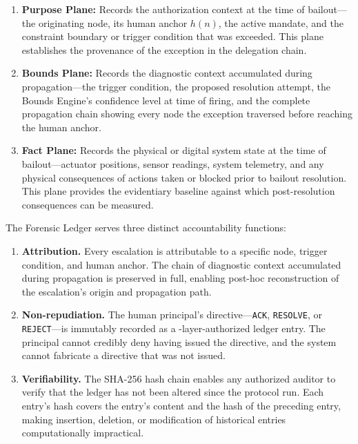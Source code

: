 \begin{enumerate}\itemsep=0pt
\item \textbf{Purpose Plane:} Records the authorization context at the time of bailout---the originating node, its human anchor $h(n)$, the active mandate, and the constraint boundary or trigger condition that was exceeded. This plane establishes the provenance of the exception in the delegation chain.

\item \textbf{Bounds Plane:} Records the diagnostic context accumulated during propagation---the trigger condition, the proposed resolution attempt, the Bounds Engine's confidence level at time of firing, and the complete propagation chain showing every node the exception traversed before reaching the human anchor.

\item \textbf{Fact Plane:} Records the physical or digital system state at the time of bailout---actuator positions, sensor readings, system telemetry, and any physical consequences of actions taken or blocked prior to bailout resolution. This plane provides the evidentiary baseline against which post-resolution consequences can be measured.
\end{enumerate}

The Forensic Ledger serves three distinct accountability functions:

\begin{enumerate}\itemsep=0pt
\item \textbf{Attribution.} Every escalation is attributable to a specific node, trigger condition, and human anchor. The chain of diagnostic context accumulated during propagation is preserved in full, enabling post-hoc reconstruction of the escalation's origin and propagation path.

\item \textbf{Non-repudiation.} The human principal's directive---\texttt{ACK}, \texttt{RESOLVE}, or \texttt{REJECT}---is immutably recorded as a \purpose-layer-authorized ledger entry. The principal cannot credibly deny having issued the directive, and the system cannot fabricate a directive that was not issued.

\item \textbf{Verifiability.} The SHA-256 hash chain enables any authorized auditor to verify that the ledger has not been altered since the protocol run. Each entry's hash covers the entry's content and the hash of the preceding entry, making insertion, deletion, or modification of historical entries computationally impractical.
\end{enumerate}

